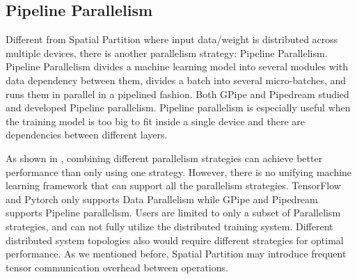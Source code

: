 \documentclass[sigplan]{acmart}\settopmatter{printfolios=true,printccs=false,printacmref=false}
\begin{document}
 \subsection{Pipeline Parallelism}
 Different from Spatial Partition where input data/weight is distributed across multiple devices, there is another parallelism strategy: Pipeline Parallelism. Pipeline Parallelism divides a machine learning model into several modules with data dependency between them, divides a batch into several micro-batches, and runs them in parallel in a pipelined fashion. Both GPipe\cite{huang2019gpipe} and Pipedream\cite{narayanan2019pipedream} studied and developed Pipeline parallelism. Pipeline parallelism is especially useful when the training model is too big to fit inside a single device and there are dependencies between different layers. \par
 As shown in \cite{krizhevsky2014one}, combining different parallelism strategies can achieve better performance than only using one strategy. However, there is no unifying machine learning framework that can support all the parallelism strategies. TensorFlow\cite{abadi2016tensorflow} and Pytorch\cite{paszke2019pytorch} only supports Data Parallelism while GPipe\cite{huang2019gpipe} and Pipedream\cite{narayanan2019pipedream} supports Pipeline parallelism. Users are limited to only a subset of Parallelism strategies, and can not fully utilize the distributed training system. Different distributed system topologies also would require different strategies for optimal performance. As we mentioned before, Spatial Partition may introduce frequent tensor communication overhead between operations.
\end{document}
